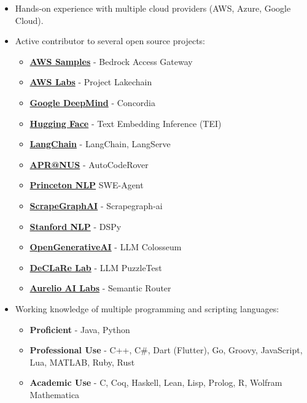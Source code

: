 \documentclass[letterpaper,11pt]{article}
\begin{document}
\begin{itemize}[leftmargin=0.15in, label={}]

    \item Hands-on experience with multiple cloud providers (AWS, Azure, Google Cloud).

    \item Active contributor to several open source projects:
    
    \begin{itemize}
        \item \textbf{\href{https://github.com/aws-samples}{AWS Samples}} - Bedrock Access Gateway
        \item \textbf{\href{https://github.com/awslabs}{AWS Labs}} - Project Lakechain
        \item \textbf{\href{https://github.com/google-deepmind}{Google DeepMind}} - Concordia
        \item \textbf{\href{https://github.com/huggingface/}{Hugging Face}} - Text Embedding Inference (TEI)
        \item \textbf{\href{https://github.com/langchain-ai/langchain}{LangChain}} - LangChain, LangServe
        \item \textbf{\href{https://github.com/nus-apr}{APR@NUS}} - AutoCodeRover
        \item \textbf{\href{https://github.com/princeton-nlp/}{Princeton NLP}} SWE-Agent
        \item \textbf{\href{https://github.com/ScrapeGraphAI/}{ScrapeGraphAI}} - Scrapegraph-ai
        \item \textbf{\href{https://github.com/stanfordnlp/}{Stanford NLP}} - DSPy
        \item \textbf{\href{https://github.com/OpenGenerativeAI}{OpenGenerativeAI}} - LLM Colosseum
        \item \textbf{\href{https://github.com/declare-lab}{DeCLaRe Lab}} - LLM PuzzleTest
        \item \textbf{\href{https://github.com/aurelio-labs}{Aurelio AI Labs}} - Semantic Router
    \end{itemize}
    
    \item Working knowledge of multiple programming and scripting languages:
    
    \begin{itemize}
        \item \textbf{Proficient} - Java, Python
        \item \textbf{Professional Use} - C++, C\#, Dart (Flutter), Go, Groovy, JavaScript, Lua, MATLAB, Ruby, Rust
        \item \textbf{Academic Use} - C, Coq, Haskell, Lean, Lisp, Prolog, R, Wolfram Mathematica
    \end{itemize}


\end{itemize}
\end{document}
